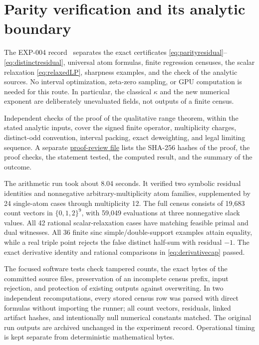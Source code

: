 ﻿\documentclass[11pt]{article}
\theoremstyle{remark}
\begin{document}
\section{Parity verification and its analytic boundary}

The EXP-004 record~\cite{RecordIV}
separates the exact certificates \eqref{eq:parityresidual}--%
\eqref{eq:distinctresidual}, universal atom formulas, finite regression
censuses, the scalar relaxation \eqref{eq:relaxedLP}, sharpness examples,
and the check of the analytic sources. No interval optimization, zeta-zero
sampling, or GPU computation is needed for this route. In particular,
the classical $\kappa$ and the new numerical exponent are deliberately
unevaluated fields, not outputs of a finite census.

Independent checks of the proof of the qualitative range theorem, within
the stated analytic inputs, cover the signed finite operator,
multiplicity charges, distinct-odd convention, interval packing, exact
deweighting, and legal limiting sequence. A separate
\href{https://github.com/fsantibanezleal/CAOS_RESEARCH/blob/main/problems/number-theory/riemann-hypothesis/experiments/EXP-004-parity-density-transfer/proof-review.json}{proof-review file}
lists the SHA-256 hashes of the proof, the proof checks, the statement
tested, the computed result, and the summary of the outcome.

The arithmetic run took about 8.04 seconds. It verified two symbolic
residual identities and
nonnegative arbitrary-multiplicity atom families, supplemented by 24
single-atom cases through multiplicity 12. The full census consists of
19,683 count vectors in $\{0,1,2\}^9$, with 59,049 evaluations at three
nonnegative slack values. All 42 rational scalar-relaxation cases have
matching feasible primal and dual witnesses. All 36 finite sinc
simple/double-support examples attain equality, while a real triple point
rejects the false distinct half-sum with residual $-1$. The exact derivative
identity and rational comparisons in \eqref{eq:derivativecap} passed.

The focused software tests check tampered counts, the exact bytes of the
committed source files, preservation of an incomplete census prefix, input
rejection, and protection of existing outputs against overwriting.
In two independent recomputations, every stored census row was parsed
with direct formulas without importing the runner; all count vectors,
residuals, linked artifact hashes, and intentionally null numerical
constants matched. The original run outputs are archived unchanged in the
experiment record. Operational timing is kept separate from deterministic
mathematical bytes.
\end{document}
